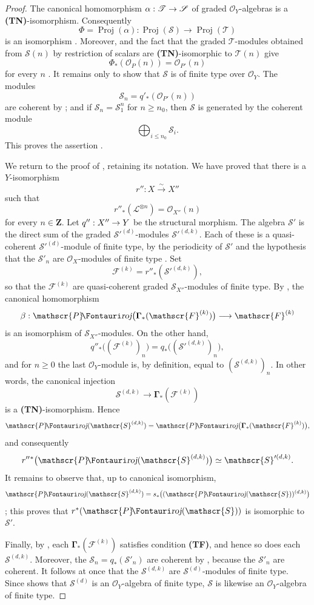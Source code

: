 \documentclass[oneside]{amsart}
\theoremstyle{ega-env-style}
\theoremstyle{ega-thm-env-style}
\theoremstyle{ega-defn-env-style}
\def\mathcal{\mathscr}
\def\sh{\mathcal}                   %
\def\bb{\mathbf}                    %
\def\leq{\leqslant}                 %
\def\geq{\geqslant}                 %
\def\bbGamma{\boldsymbol\Gamma}
\def\Proj{\operatorname{Proj}}
\renewcommand{\to}{\mathchoice{\longrightarrow}{\rightarrow}{\rightarrow}{\rightarrow}}
\def\simto{\xrightarrow{\sim}}
\def\shProj{\sh{P}\textup{\kern-2.2pt{\Fontauri\slshape roj}}} %
\let\EGAOriginalLabel\label
\renewcommand{\label}[1]{\phantomsection\EGAOriginalLabel{#1}}
\begin{document}
\begin{proof}
The canonical homomorphism $\alpha:\sh{T}\to\sh{S}$ of graded $\sh{O}_Y$-algebras is a \textbf{(TN)}-isomorphism.
Consequently
\label{III.2.3.5.1}
\[
  \Phi=\Proj(\alpha):\Proj(\sh{S})\longrightarrow\Proj(\sh{T})
\]
is an isomorphism .
Moreover,  and the fact that the graded $\sh{T}$-modules obtained from $\sh{S}(n)$ by restriction of scalars are \textbf{(TN)}-isomorphic to $\sh{T}(n)$ give
\[
  \Phi_*(\sh{O}_P(n))=\sh{O}_{P'}(n)
\]
for every $n$ .
It remains only to show that $\sh{S}$ is of finite type over $\sh{O}_Y$.
The modules
\[
  \sh{S}_n=q'_*(\sh{O}_{P'}(n))
\]
are coherent by ; and if $\sh{S}_n=\sh{S}_1^n$ for $n\geq n_0$, then $\sh{S}$ is generated by the coherent module
\[
  \bigoplus_{i\leq n_0}\sh{S}_i.
\]
This proves the assertion .

We return to the proof of , retaining its notation.
We have proved that there is a $Y$-isomorphism
\[
  r'':X\simto X''
\]
such that
\[
  r''_*(\sh{L}^{\otimes n})=\sh{O}_{X''}(n)
\]
for every $n\in\bb{Z}$.
Let $q'':X''\to Y$ be the structural morphism.
The algebra $\sh{S}'$ is the direct sum of the graded $\sh{S}'^{(d)}$-modules $\sh{S}'^{(d,k)}$.
Each of these is a quasi-coherent $\sh{S}'^{(d)}$-module of finite type, by the periodicity of $\sh{S}'$ and the hypothesis that the $\sh{S}'_n$ are $\sh{O}_X$-modules of finite type .
Set
\[
  \sh{F}^{(k)}=r''_*(\sh{S}'^{(d,k)}),
\]
so that the $\sh{F}^{(k)}$ are quasi-coherent graded $\sh{S}_{X''}$-modules of finite type.
By , the canonical homomorphism
\[
  \beta:\shProj\bigl(\bbGamma_*(\sh{F}^{(k)})\bigr)
  \longrightarrow\sh{F}^{(k)}
\]
is an isomorphism of $\sh{S}_{X''}$-modules.
On the other hand,
\[
  q''_*\bigl((\sh{F}^{(k)})_n\bigr)
  =q_*\bigl((\sh{S}'^{(d,k)})_n\bigr),
\]
and for $n\geq0$ the last $\sh{O}_Y$-module is, by definition, equal to $(\sh{S}^{(d,k)})_n$.
In other words, the canonical injection
\[
  \sh{S}^{(d,k)}
  \longrightarrow\bbGamma_*(\sh{F}^{(k)})
\]
is a \textbf{(TN)}-isomorphism.
Hence
\[
  \shProj(\sh{S}^{(d,k)})
  =\shProj\bigl(\bbGamma_*(\sh{F}^{(k)})\bigr),
\]
and consequently
\[
  r''{}^*\bigl(\shProj(\sh{S}^{(d,k)})\bigr)
  \simeq\sh{S}'^{(d,k)}.
\]
It remains to observe that, up to canonical isomorphism,
\[
  \shProj(\sh{S}^{(d,k)})
  =s_*\bigl((\shProj(\sh{S}))^{(d,k)}\bigr)
\]
; this proves that $r^*(\shProj(\sh{S}))$ is isomorphic to $\sh{S}'$.

Finally, by , each $\bbGamma_*(\sh{F}^{(k)})$ satisfies condition \textbf{(TF)}, and hence so does each $\sh{S}^{(d,k)}$.
Moreover, the $\sh{S}_n=q_*(\sh{S}'_n)$ are coherent by , because the $\sh{S}'_n$ are coherent.
It follows at once that the $\sh{S}^{(d,k)}$ are $\sh{S}^{(d)}$-modules of finite type.
Since  shows that $\sh{S}^{(d)}$ is an $\sh{O}_Y$-algebra of finite type, $\sh{S}$ is likewise an $\sh{O}_Y$-algebra of finite type.
\end{proof}
\end{document}
